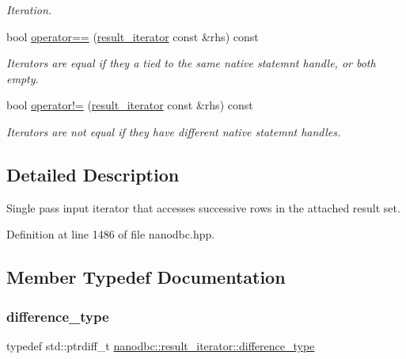 \begin{DoxyCompactItemize}
\begin{DoxyCompactList}\small\item\em Iteration. \end{DoxyCompactList}\item 
bool \mbox{\hyperlink{classnanodbc_1_1result__iterator_a8db639b2b70997cb2e7c79368cb0f994}{operator==}} (\mbox{\hyperlink{classnanodbc_1_1result__iterator}{result\+\_\+iterator}} const \&rhs) const
\begin{DoxyCompactList}\small\item\em Iterators are equal if they a tied to the same native statemnt handle, or both empty. \end{DoxyCompactList}\item 
bool \mbox{\hyperlink{classnanodbc_1_1result__iterator_adb39628c4e759b39b85ba4a43b9f75e0}{operator!=}} (\mbox{\hyperlink{classnanodbc_1_1result__iterator}{result\+\_\+iterator}} const \&rhs) const
\begin{DoxyCompactList}\small\item\em Iterators are not equal if they have different native statemnt handles. \end{DoxyCompactList}\end{DoxyCompactItemize}


\subsection{Detailed Description}
Single pass input iterator that accesses successive rows in the attached result set. 

Definition at line 1486 of file nanodbc.\+hpp.



\subsection{Member Typedef Documentation}
\mbox{\label{classnanodbc_1_1result__iterator_af16f09f398c533c9346d521a2ea9aeef}} 
\subsubsection{\texorpdfstring{difference\_type}{difference\_type}}
{\footnotesize\ttfamily typedef std\+::ptrdiff\+\_\+t \mbox{\hyperlink{classnanodbc_1_1result__iterator_af16f09f398c533c9346d521a2ea9aeef}{nanodbc\+::result\+\_\+iterator\+::difference\+\_\+type}}}



